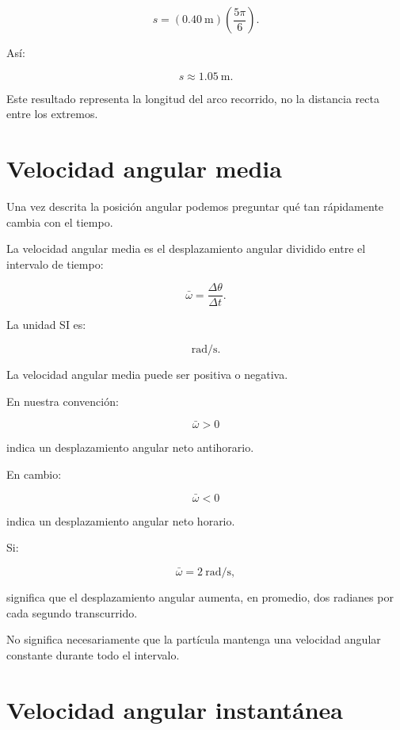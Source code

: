 \[
s
=
(\SI{0.40}{\meter})
\left(
\frac{5\pi}{6}
\right).
\]

Así:

\[
\boxed{s\approx\SI{1.05}{\meter}}.
\]

Este resultado representa la longitud del arco recorrido, no la distancia
recta entre los extremos.


\section{Velocidad angular media}

Una vez descrita la posición angular podemos preguntar qué tan rápidamente
cambia con el tiempo.

\begin{definicion}

La velocidad angular media es el desplazamiento angular dividido entre el
intervalo de tiempo:

\[
\boxed{
\bar{\omega}
=
\frac{\Delta\theta}{\Delta t}
}.
\]

\end{definicion}

La unidad SI es:

\[
\si{\radian\per\second}.
\]

La velocidad angular media puede ser positiva o negativa.

En nuestra convención:

\[
\bar{\omega}>0
\]

indica un desplazamiento angular neto antihorario.

En cambio:

\[
\bar{\omega}<0
\]

indica un desplazamiento angular neto horario.

\begin{interpretacion}

Si:

\[
\bar{\omega}
=
\SI{2}{\radian\per\second},
\]

significa que el desplazamiento angular aumenta, en promedio, dos radianes por
cada segundo transcurrido.

No significa necesariamente que la partícula mantenga una velocidad angular
constante durante todo el intervalo.

\end{interpretacion}


\section{Velocidad angular instantánea}


